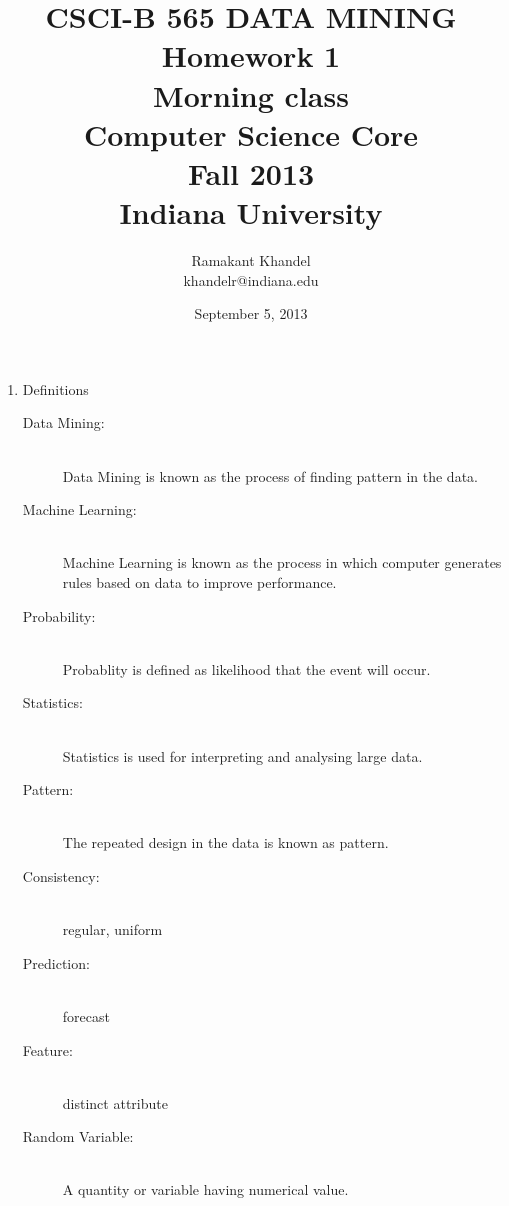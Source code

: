 \documentclass{article}
\title{ CSCI-B 565 DATA MINING\\
Homework 1\\
Morning class\\
Computer Science Core \\ Fall 2013 \\ Indiana University}
\author{ Ramakant Khandel \\ khandelr@indiana.edu\\}
\date {September 5, 2013}
\begin{document}
\maketitle
\begin{enumerate}
\item Definitions
\begin{description}

\item[ Data Mining:] \hfill \\

Data Mining is known as the process of finding pattern in the data.

\item[Machine Learning:] \hfill \\

Machine Learning is known as the process in which computer generates rules based on data to improve performance.

\item[Probability:] \hfill \\

Probablity is defined as likelihood that the event will occur.

\item[Statistics:] \hfill \\

Statistics is used for interpreting and analysing large data.

\item[Pattern:] \hfill \\

The repeated design in the data is known as pattern.

\item[Consistency:] \hfill \\

regular, uniform

\item[Prediction: ] \hfill \\

forecast

\item[Feature: ] \hfill \\

distinct attribute

\item[Random Variable:] \hfill \\

A quantity or variable having numerical value.

\end{description}


\end{enumerate}
\end{document}
